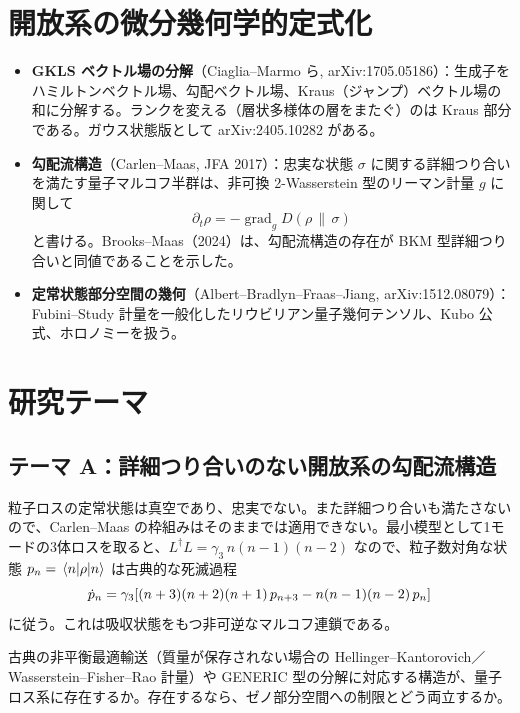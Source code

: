 \documentclass[11pt]{ltjsarticle}
\begin{document}
\section{開放系の微分幾何学的定式化}

\begin{itemize}
\item \textbf{GKLS ベクトル場の分解}（Ciaglia--Marmo ら, arXiv:1705.05186）：生成子をハミルトンベクトル場、勾配ベクトル場、Kraus（ジャンプ）ベクトル場の和に分解する。ランクを変える（層状多様体の層をまたぐ）のは Kraus 部分である。ガウス状態版として arXiv:2405.10282 がある。
\item \textbf{勾配流構造}（Carlen--Maas, JFA 2017）：忠実な状態 $\sigma$ に関する詳細つり合いを満たす量子マルコフ半群は、非可換 2-Wasserstein 型のリーマン計量 $g$ に関して
\begin{equation}
\partial_t\rho = -\operatorname{grad}_g D(\rho\,\|\,\sigma)
\end{equation}
と書ける。Brooks--Maas（2024）は、勾配流構造の存在が BKM 型詳細つり合いと同値であることを示した。
\item \textbf{定常状態部分空間の幾何}（Albert--Bradlyn--Fraas--Jiang, arXiv:1512.08079）：Fubini--Study 計量を一般化したリウビリアン量子幾何テンソル、Kubo 公式、ホロノミーを扱う。
\end{itemize}

\section{研究テーマ}

\subsection*{テーマ A：詳細つり合いのない開放系の勾配流構造}

粒子ロスの定常状態は真空であり、忠実でない。また詳細つり合いも満たさないので、Carlen--Maas の枠組みはそのままでは適用できない。最小模型として1モードの3体ロスを取ると、$L^\dagger L = \gamma_3\, n(n-1)(n-2)$ なので、粒子数対角な状態 $p_n = \mel{n}{\rho}{n}$ は古典的な死滅過程
\begin{equation}
\dot p_n = \gamma_3\qty[(n+3)(n+2)(n+1)\,p_{n+3} - n(n-1)(n-2)\,p_n]
\end{equation}
に従う。これは吸収状態をもつ非可逆なマルコフ連鎖である。

\begin{question}
\unverified{} 古典の非平衡最適輸送（質量が保存されない場合の Hellinger--Kantorovich／Wasserstein--Fisher--Rao 計量）や GENERIC 型の分解に対応する構造が、量子ロス系に存在するか。存在するなら、ゼノ部分空間への制限とどう両立するか。
\end{question}
\end{document}

